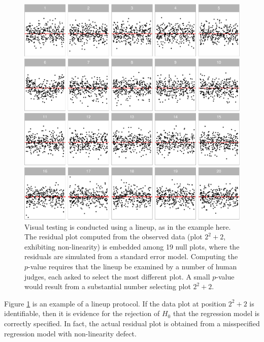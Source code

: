 \documentclass[]{interact}
\theoremstyle{plain}%
\theoremstyle{definition}
\theoremstyle{remark}
\begin{document}
\begin{figure}

{\centering \includegraphics[width=1\linewidth]{paper_comparison_files/figure-latex/first-example-lineup-1} 

}

\caption{Visual testing is conducted using a lineup, as in the example here. The residual plot computed from the observed data (plot $2^2 + 2$, exhibiting non-linearity) is embedded among 19 null plots, where the residuals are simulated from a standard error model. Computing the $p$-value requires that the lineup be examined by a number of human judges, each asked to select the most different plot. A small $p$-value would result from a substantial number selecting plot $2^2 + 2$.}\label{fig:first-example-lineup}
\end{figure}

Figure \ref{fig:first-example-lineup} is an example of a lineup
protocol. If the data plot at position \(2^2 + 2\) is identifiable, then
it is evidence for the rejection of \(H_0\) that the regression model is
correctly specified. In fact, the actual residual plot is obtained from
a misspecified regression model with non-linearity defect.
\end{document}
